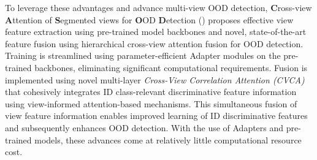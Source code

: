 To leverage these advantages and advance multi-view OOD detection, \textbf{C}ross-view \textbf{A}ttention of \textbf{S}egmented views for \textbf{O}OD \textbf{D}etection (\textbf{\sys}) proposes effective view feature extraction using pre-trained model backbones and novel, state-of-the-art feature fusion using hierarchical cross-view attention fusion for OOD detection. Training is streamlined using parameter-efficient Adapter modules \cite{hu2021lora} on the pre-trained backbones, eliminating significant computational requirements. Fusion is implemented using novel multi-layer \textit{Cross-View Correlation Attention (CVCA)} that cohesively integrates ID class-relevant discriminative feature information using view-informed attention-based mechanisms. This simultaneous fusion of view feature information enables improved learning of ID discriminative features and subsequently enhances OOD detection. With the use of Adapters and pre-trained models, these advances come at relatively little computational resource cost.

